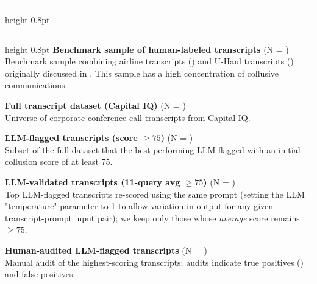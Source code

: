 \begin{table}[htbp]
\centering
\caption{Transcript Samples Used in the Analysis}
\label{tab:samples}
\begin{minipage}{\textwidth}
\raggedright
\hrule height 0.8pt
\vspace{0.2em}
\hrule height 0.8pt
\vspace{0.5em}
\textbf{Benchmark sample of human-labeled transcripts} (N = ) \\
Benchmark sample combining \textcite{aryal2022coordinated} airline transcripts () and U-Haul transcripts () originally discussed in \textcite{harrington2022collusion}. This sample has a high concentration of collusive communications.

\vspace{1em}
\textbf{Full transcript dataset (Capital IQ)} (N = ) \\
Universe of corporate conference call transcripts from Capital IQ.


\vspace{1em}
\textbf{LLM-flagged transcripts (score $\ge 75$)} (N = ) \\
Subset of the full dataset that the best-performing LLM flagged with an initial collusion score of at least 75.

\vspace{1em}
\textbf{LLM-validated transcripts (11-query avg $\ge 75$)} (N = ) \\
Top LLM-flagged transcripts re-scored using the same prompt (setting the LLM "temperature" parameter to 1 to allow variation in output for any given transcript-prompt input pair); we keep only those whose \emph{average} score remains $\ge 75$.

\vspace{1em}
\textbf{Human-audited LLM-flagged transcripts} (N = ) \\
Manual audit of the highest-scoring  transcripts; audits indicate  true positives () and  false positives.


\end{minipage}
\end{table}
